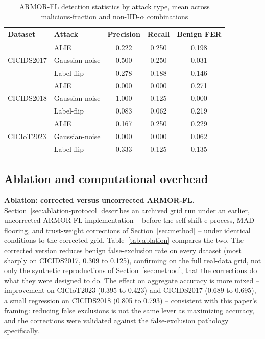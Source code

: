 \documentclass[pdflatex,iicol,sn-mathphys-num]{sn-jnl}%
\theoremstyle{thmstyleone}%
\theoremstyle{thmstyletwo}%
\theoremstyle{thmstylethree}%
\begin{document}
\begin{table}[htbp]
\centering
\caption{ARMOR-FL detection statistics by attack type, mean across malicious-fraction and non-IID-$\alpha$ combinations}\label{tab:detectionattack}
\footnotesize
\begin{tabular}{@{}llccc@{}}
\toprule
Dataset & Attack & Precision & Recall & Benign FER \\
\midrule
\multirow{3}{*}{CICIDS2017} & ALIE & 0.222 & 0.250 & 0.198 \\
 & Gaussian-noise & 0.500 & 0.250 & 0.031 \\
 & Label-flip & 0.278 & 0.188 & 0.146 \\
\midrule
\multirow{3}{*}{CICIDS2018} & ALIE & 0.000 & 0.000 & 0.271 \\
 & Gaussian-noise & 1.000 & 0.125 & 0.000 \\
 & Label-flip & 0.083 & 0.062 & 0.219 \\
\midrule
\multirow{3}{*}{CICIoT2023} & ALIE & 0.167 & 0.250 & 0.229 \\
 & Gaussian-noise & 0.000 & 0.000 & 0.062 \\
 & Label-flip & 0.333 & 0.125 & 0.135 \\
\bottomrule
\end{tabular}
\end{table}

\subsection{Ablation and computational overhead}\label{sec:ablationresults}

\textbf{Ablation: corrected versus uncorrected ARMOR-FL.} Section~\ref{sec:ablation-protocol} describes an archived grid run under an earlier, uncorrected ARMOR-FL implementation -- before the self-shift e-process, MAD-flooring, and trust-weight corrections of Section~\ref{sec:method} -- under identical conditions to the corrected grid. Table~\ref{tab:ablation} compares the two. The corrected version reduces benign false-exclusion rate on every dataset (most sharply on CICIDS2017, 0.309 to 0.125), confirming on the full real-data grid, not only the synthetic reproductions of Section~\ref{sec:method}, that the corrections do what they were designed to do. The effect on aggregate accuracy is more mixed -- improvement on CICIoT2023 (0.395 to 0.423) and CICIDS2017 (0.689 to 0.695), a small regression on CICIDS2018 (0.805 to 0.793) -- consistent with this paper's framing: reducing false exclusions is not the same lever as maximizing accuracy, and the corrections were validated against the false-exclusion pathology specifically.
\end{document}
